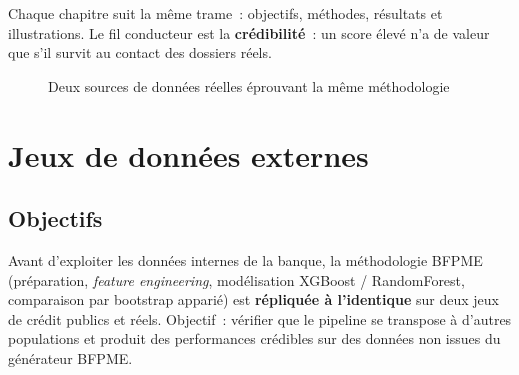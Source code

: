 \documentclass[a4paper,11pt]{report}
\begin{document}
\noindent Chaque chapitre suit la même trame~: objectifs, méthodes, résultats et illustrations.
Le fil conducteur est la \textbf{crédibilité}~: un score élevé n'a de valeur que s'il survit au
contact des dossiers réels.

\begin{figure}[H]
\centering
{}
\caption{Deux sources de données réelles éprouvant la même méthodologie}
\end{figure}

\chapter{Jeux de données externes}

\section{Objectifs}

Avant d'exploiter les données internes de la banque, la méthodologie BFPME (préparation,
\textit{feature engineering}, modélisation XGBoost / RandomForest, comparaison par bootstrap
apparié) est \textbf{répliquée à l'identique} sur deux jeux de crédit publics et réels. Objectif~:
vérifier que le pipeline se transpose à d'autres populations et produit des performances
crédibles sur des données non issues du générateur BFPME.
\end{document}
